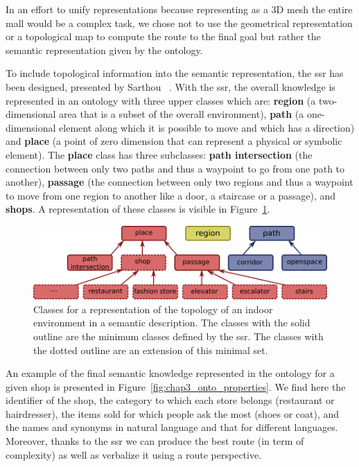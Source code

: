 \documentclass[a4paper,11pt,twoside]{StyleThese}
\begin{document}
In an effort to unify representations because representing as a 3D mesh the entire mall would be a complex task, we chose not to use the geometrical representation or a topological map to compute the route to the final goal but rather the semantic representation given by the ontology.

To include topological information into the semantic representation, the \acrfull{ssr} has been designed, presented by Sarthou \etal{}~\cite{sarthou_2019_semantic}. With the \acrshort{ssr}, the overall knowledge is represented in an ontology with three upper classes which are: \textbf{region} (\ie a two-dimensional area that is a subset of the overall environment), \textbf{path} (\ie a one-dimensional element along which it is possible to move and which has a direction) and \textbf{place} (\ie a point of zero dimension that can represent a physical or symbolic element). The \textbf{place} class has three subclasses: \textbf{path intersection} (\ie the connection between only two paths and thus a waypoint to go from one path to another), \textbf{passage} (\ie the connection between only two regions and thus a waypoint to move from one region to another like a door, a staircase or a passage), and \textbf{shops}. A representation of these classes is visible in Figure~\ref{fig:chap3_onto_classes}.

\begin{figure}[!ht]
	\centering
	\includegraphics[scale=0.45]{figures/chapter3/classes.png}
	\caption{\label{fig:chap3_onto_classes} Classes for a representation of the topology of an indoor environment in a semantic description. The classes with the solid outline are the minimum classes defined by the \acrshort{ssr}. The classes with the dotted outline are an extension of this minimal set.}
\end{figure}

An example of the final semantic knowledge represented in the ontology for a given shop is presented in Figure~\ref{fig:chap3_onto_properties}. We find here the identifier of the shop, the category to which each store belongs (\eg restaurant or hairdresser), the items sold for which people ask the most (\eg shoes or coat), and the names and synonyms in natural language and that for different languages.
Moreover, thanks to the \acrshort{ssr} we can produce the best route (in term of complexity) as well as verbalize it using a route perspective.
\end{document}
